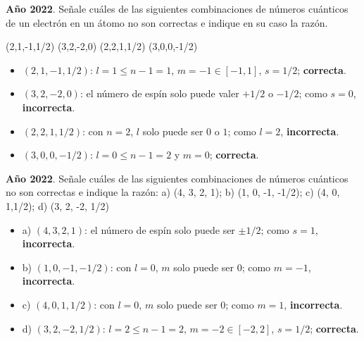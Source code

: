 \begin{exerciseEVAU}
    \textbf{Año 2022}.
    Señale cuáles de las siguientes combinaciones de números cuánticos de un electrón en un átomo no son correctas e indique en su caso la razón.
    \begin{center}
        (2,1,-1,1/2) (3,2,-2,0) (2,2,1,1/2) (3,0,0,-1/2)
    \end{center}
    \begin{solu}
        \begin{itemize}
            \item \((2,1,-1,1/2)\): \(l=1\leq n-1=1\), \(m=-1\in[-1,1]\), \(s=1/2\); \textbf{correcta}.
            \item \((3,2,-2,0)\): el número de espín solo puede valer \(+1/2\) o \(-1/2\); como \(s=0\), \textbf{incorrecta}.
            \item \((2,2,1,1/2)\): con \(n=2\), \(l\) solo puede ser \(0\) o \(1\); como \(l=2\), \textbf{incorrecta}.
            \item \((3,0,0,-1/2)\): \(l=0\leq n-1=2\) y \(m=0\); \textbf{correcta}.
        \end{itemize}
    \end{solu}
\end{exerciseEVAU}

\begin{exerciseEVAU}
    \textbf{Año 2022}.
    Señale cuáles de las siguientes combinaciones de números cuánticos no son correctas e indique la razón: a) (4, 3, 2, 1); b) (1, 0, -1, -1/2); c) (4, 0, 1,1/2); d) (3, 2, -2, 1/2)
    \begin{solu}
        \begin{itemize}
            \item a) \((4,3,2,1)\): el número de espín solo puede ser \(\pm 1/2\); como \(s=1\), \textbf{incorrecta}.
            \item b) \((1,0,-1,-1/2)\): con \(l=0\), \(m\) solo puede ser \(0\); como \(m=-1\), \textbf{incorrecta}.
            \item c) \((4,0,1,1/2)\): con \(l=0\), \(m\) solo puede ser \(0\); como \(m=1\), \textbf{incorrecta}.
            \item d) \((3,2,-2,1/2)\): \(l=2\leq n-1=2\), \(m=-2\in[-2,2]\), \(s=1/2\); \textbf{correcta}.
        \end{itemize}
    \end{solu}
\end{exerciseEVAU}

